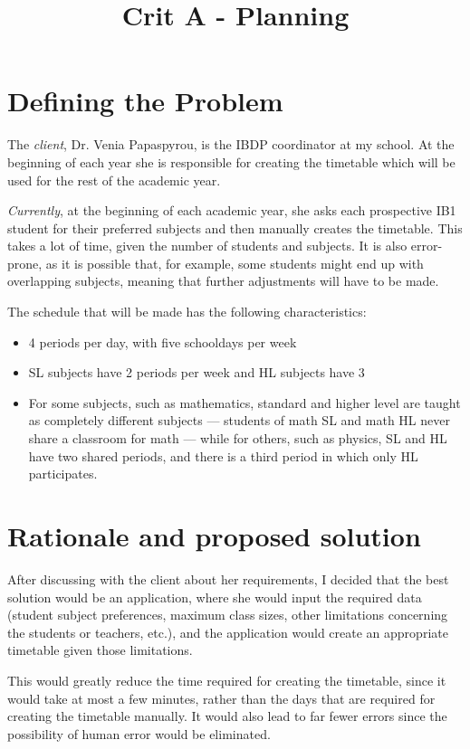 \documentclass[a4paper, 12pt]{article}
\title{Crit A - Planning}
\date{}
\begin{document}
\maketitle

\section{Defining the Problem}

The \emph{client}, Dr. Venia Papaspyrou, is the IBDP coordinator at my school. At the
beginning of each year she is responsible for creating the timetable which will be used for
the rest of the academic year. 

\emph{Currently}, at the beginning of each academic year, she asks each prospective IB1
student for their preferred subjects and then manually creates the timetable. This takes a
lot of time, given the number of students and subjects. It is also error-prone, as it is
possible that, for example, some students might end up with overlapping subjects, meaning
that further adjustments will have to be made. 

The schedule that will be made has the following characteristics:
%
\begin{itemize}
    \item 4 periods per day, with five schooldays per week
    \item SL subjects have 2 periods per week and HL subjects have 3
    \item For some subjects, such as mathematics, standard and higher level are taught as
        completely different subjects --- students of math SL and math HL never share a
        classroom for math --- while for others, such as physics, SL and HL have two shared
        periods, and there is a third period in which only HL participates. 
\end{itemize}
%

\section{Rationale and proposed solution}

After discussing with the client about her requirements, I decided that the best solution
would be an application, where she would input the required data (student subject
preferences, maximum class sizes, other limitations concerning the students or teachers,
etc.), and the application would create an appropriate timetable given those limitations. 

This would greatly reduce the time required for creating the timetable, since it would take
at most a few minutes, rather than the days that are required for creating the timetable
manually. It would also lead to far fewer errors since the possibility of human error would
be eliminated. 
\end{document}
